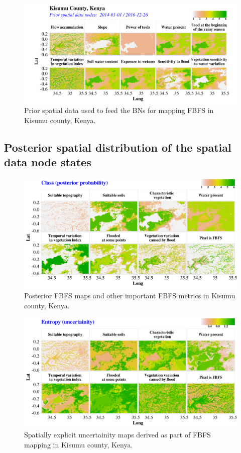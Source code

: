 \documentclass[12pt,oneside]{article}
\begin{document}
\begin{figure}
\includegraphics[width=1\linewidth]{figures/Mapping_FBFS_prior_maps} \caption{Prior spatial data used to feed the BNs for mapping FBFS in Kisumu county, Kenya.}\label{fig:fig11}
\end{figure}

\hypertarget{I.5}{%
\subsection{Posterior spatial distribution of the spatial data node
states}\label{I.5}}

\begin{figure}
\includegraphics[width=1\linewidth]{figures/Mapping_FBFS_posterior_maps} \caption{Posterior FBFS maps and other important FBFS metrics in Kisumu county, Kenya.}\label{fig:fig12}
\end{figure}

\begin{figure}
\includegraphics[width=1\linewidth]{figures/Mapping_FBFS_uncertainity_maps} \caption{Spatially explicit uncertainity maps derived as part of FBFS mapping in Kisumu county, Kenya.}\label{fig:fig13}
\end{figure}
\end{document}
